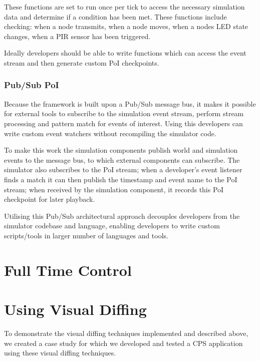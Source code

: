 These functions are set to run once per tick to access the necessary simulation data and determine if a condition has been met. These functions include checking: when a node transmits, when a node moves, when a nodes LED state changes, when a PIR sensor has been triggered.

Ideally developers should be able to write functions which can access the event stream and then generate custom PoI checkpoints.

\subsubsection{Pub/Sub PoI} %
\label{sub:pub_sub_poi}
Because the framework is built upon a Pub/Sub message bus, it makes it possible for external tools to subscribe to the simulation event stream, perform stream processing and pattern match for events of interest. Using this developers can write custom event watchers without recompiling the simulator code.

To make this work the simulation components publish world and simulation events to the message bus, to which external components can subscribe. The simulator also subscribes to the PoI stream; when a developer's event listener finds a match it can then publish the timestamp and event name to the PoI stream; when received by the simulation component, it records this PoI checkpoint for later playback.

Utilising this Pub/Sub architectural approach decouples developers from the simulator codebase and language, enabling developers to write custom scripts/tools in larger number of languages and tools.

\section{Full Time Control} %
\label{sec:full_time_control}


\section{Using Visual Diffing} %
\label{sec:using_visual_diffing}
To demonstrate the visual diffing techniques implemented and described above, we created a case study for which we developed and tested a CPS application using these visual diffing techniques. 

